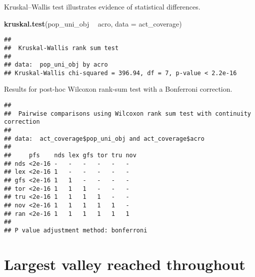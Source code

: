 \documentclass[]{book}
\newenvironment{Shaded}{\begin{snugshade}}{\end{snugshade}}
\newcommand{\DataTypeTok}[1]{\textcolor[rgb]{0.13,0.29,0.53}{#1}}
\newcommand{\KeywordTok}[1]{\textcolor[rgb]{0.13,0.29,0.53}{\textbf{#1}}}
\newcommand{\NormalTok}[1]{#1}
\newcommand{\OperatorTok}[1]{\textcolor[rgb]{0.81,0.36,0.00}{\textbf{#1}}}
\newcommand{\OtherTok}[1]{\textcolor[rgb]{0.56,0.35,0.01}{#1}}
\newcommand{\StringTok}[1]{\textcolor[rgb]{0.31,0.60,0.02}{#1}}
\begin{document}
Kruskal--Wallis test illustrates evidence of statistical differences.

\begin{Shaded}
\begin{Highlighting}[]
\KeywordTok{kruskal.test}\NormalTok{(pop_uni_obj }\OperatorTok{~}\StringTok{ }\NormalTok{acro, }\DataTypeTok{data =}\NormalTok{ act_coverage)}
\end{Highlighting}
\end{Shaded}

\begin{verbatim}
## 
##  Kruskal-Wallis rank sum test
## 
## data:  pop_uni_obj by acro
## Kruskal-Wallis chi-squared = 396.94, df = 7, p-value < 2.2e-16
\end{verbatim}

Results for post-hoc Wilcoxon rank-sum test with a Bonferroni correction.

\begin{Shaded}
\end{Shaded}

\begin{verbatim}
## 
##  Pairwise comparisons using Wilcoxon rank sum test with continuity correction 
## 
## data:  act_coverage$pop_uni_obj and act_coverage$acro 
## 
##     pfs    nds lex gfs tor tru nov
## nds <2e-16 -   -   -   -   -   -  
## lex <2e-16 1   -   -   -   -   -  
## gfs <2e-16 1   1   -   -   -   -  
## tor <2e-16 1   1   1   -   -   -  
## tru <2e-16 1   1   1   1   -   -  
## nov <2e-16 1   1   1   1   1   -  
## ran <2e-16 1   1   1   1   1   1  
## 
## P value adjustment method: bonferroni
\end{verbatim}

\hypertarget{largest-valley-reached-throughout-2}{%
\section{Largest valley reached throughout}\label{largest-valley-reached-throughout-2}}
\end{document}
